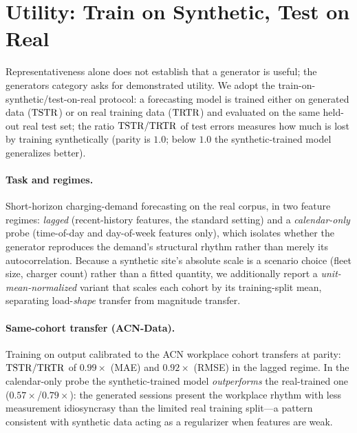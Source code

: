 \section{Utility: Train on Synthetic, Test on Real}
\label{sec:utility}

Representativeness alone does not establish that a generator is useful; the
generators category asks for demonstrated utility. We adopt the
train-on-synthetic/test-on-real protocol: a forecasting model is trained
either on generated data ($\mathrm{TSTR}{}$) or on real training data ($\mathrm{TRTR}{}$) and
evaluated on the same held-out real test set; the ratio $\mathrm{TSTR}{}/\mathrm{TRTR}{}$ of
test errors measures how much is lost by training synthetically (parity is
$1.0$; below $1.0$ the synthetic-trained model generalizes better).

\paragraph{Task and regimes.}
Short-horizon charging-demand forecasting on the real corpus, in two feature
regimes: \emph{lagged} (recent-history features, the standard setting) and a
\emph{calendar-only} probe (time-of-day and day-of-week features only), which
isolates whether the generator reproduces the demand's structural rhythm
rather than merely its autocorrelation. Because a synthetic site's absolute
scale is a scenario choice (fleet size, charger count) rather than a fitted
quantity, we additionally report a \emph{unit-mean-normalized} variant that
scales each cohort by its training-split mean, separating load-\emph{shape}
transfer from magnitude transfer.

\paragraph{Same-cohort transfer (ACN-Data).}
Training on \generator{} output calibrated to the ACN workplace cohort
transfers at parity: $\mathrm{TSTR}{}/\mathrm{TRTR}{}$ of $0.99\times$ (MAE) and $0.92\times$
(RMSE) in the lagged regime. In the calendar-only probe the synthetic-trained
model \emph{outperforms} the real-trained one ($0.57\times$/$0.79\times$):
the generated sessions present the workplace rhythm with less measurement
idiosyncrasy than the limited real training split---a pattern consistent with
synthetic data acting as a regularizer when features are weak.

